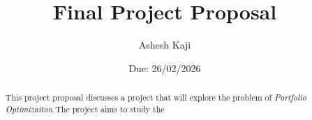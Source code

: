 \documentclass[11pt]{article}
\title{Final Project Proposal}
\author{Ashesh Kaji}
\date{Due: 26/02/2026}
\begin{document}
\maketitle
\begin{abstract}
    This project proposal discusses a project that will explore the problem of \emph{Portfolio Optimizaiton} The project aims to study the
\end{abstract}
\end{document}
